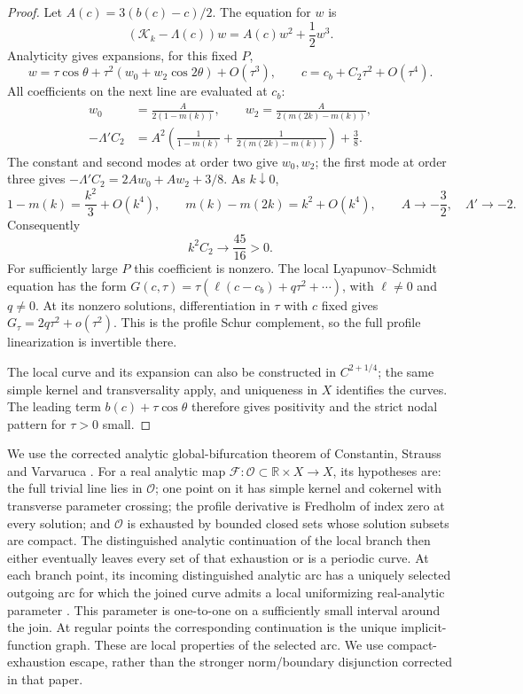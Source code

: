 \documentclass[11pt,a4paper]{article}
\theoremstyle{remark}
\newcommand{\R}{\mathbb R}
\newcommand{\K}{\mathcal K}
\newcommand{\F}{\mathcal F}
\begin{document}
\begin{proof}
Let $A(c)=3(b(c)-c)/2$. The equation for $w$ is
\begin{equation}\label{eq:w-equation}
 (\K_k-\Lambda(c))w=A(c)w^2+\frac12w^3.
\end{equation}
Analyticity gives expansions, for this fixed $P$,
\[
 w=\tau\cos\theta+\tau^2(w_0+w_2\cos2\theta)+O(\tau^3),
 \qquad c=c_b+C_2\tau^2+O(\tau^4).
\]
All coefficients on the next line are evaluated at $c_b$:
\begin{equation}\label{eq:bifurcation-coefficients}
 \begin{split}
 w_0&=\frac{A}{2(1-m(k))},\qquad
 w_2=\frac{A}{2(m(2k)-m(k))},\\
 -\Lambda'C_2&=A^2\left(\frac1{1-m(k)}
              +\frac1{2(m(2k)-m(k))}\right)+\frac38.
 \end{split}
\end{equation}
The constant and second modes at order two give $w_0,w_2$; the first mode
at order three gives $-\Lambda'C_2=2Aw_0+Aw_2+3/8$.
As $k\downarrow0$,
\[
 1-m(k)=\frac{k^2}{3}+O(k^4),\qquad
 m(k)-m(2k)=k^2+O(k^4),\qquad
 A\longrightarrow-\frac32,\quad \Lambda'\longrightarrow-2.
\]
Consequently
\begin{equation}\label{eq:C2-limit}
 k^2C_2\longrightarrow\frac{45}{16}>0.
\end{equation}
For sufficiently large $P$ this coefficient is nonzero. The local
Lyapunov--Schmidt equation has the form
$G(c,\tau)=\tau(\ell(c-c_b)+q\tau^2+\cdots)$, with
$\ell\ne0$ and $q\ne0$. At its nonzero solutions, differentiation in
$\tau$ with $c$ fixed gives $G_\tau=2q\tau^2+o(\tau^2)$.
This is the profile Schur complement, so the full profile linearization
is invertible there.

The local curve and its expansion can also be constructed in $C^{2+1/4}$;
the same simple kernel and transversality apply, and uniqueness in $X$
identifies the curves. The leading term $b(c)+\tau\cos\theta$ therefore
gives positivity and the strict nodal pattern for $\tau>0$ small.
\end{proof}

We use the corrected analytic global-bifurcation theorem of
Constantin, Strauss and Varvaruca \cite[Theorem 4, Remarks 3--4]{CSV}.
For a real analytic map $\F:\mathcal O\subset\R\times X\to X$, its
hypotheses are: the full trivial line lies in $\mathcal O$; one point on
it has simple kernel and cokernel with transverse parameter crossing;
the profile derivative is Fredholm of index zero at every solution; and
$\mathcal O$ is exhausted by bounded closed sets whose solution subsets
are compact. The distinguished analytic continuation of the local branch
then either eventually leaves every set of that exhaustion or is a
periodic curve. At each branch point, its incoming distinguished analytic
arc has a uniquely selected outgoing arc for which the joined curve admits
a local uniformizing real-analytic parameter
\cite[Remark~3 and Figure~2, preprint pp.~14--15]{CSV}.
This parameter is one-to-one on a sufficiently small interval around the
join. At regular points the corresponding continuation is the unique
implicit-function graph. These are local properties of the selected arc.
We use compact-exhaustion escape,
rather than the stronger norm/boundary disjunction corrected in that paper.
\end{document}
